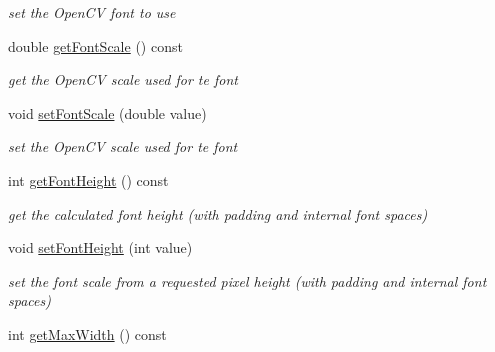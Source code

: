 \begin{DoxyCompactItemize}
\begin{DoxyCompactList}\small\item\em set the Open\+CV font to use \end{DoxyCompactList}\item 
double \hyperlink{classcanvascv_1_1Text_a8af0c36c755f596b31cedf3043a51552}{get\+Font\+Scale} () const \hypertarget{classcanvascv_1_1Text_a8af0c36c755f596b31cedf3043a51552}{}\label{classcanvascv_1_1Text_a8af0c36c755f596b31cedf3043a51552}

\begin{DoxyCompactList}\small\item\em get the Open\+CV scale used for te font \end{DoxyCompactList}\item 
void \hyperlink{classcanvascv_1_1Text_a6541ae87e4577272feef0e30e1d5a24d}{set\+Font\+Scale} (double value)\hypertarget{classcanvascv_1_1Text_a6541ae87e4577272feef0e30e1d5a24d}{}\label{classcanvascv_1_1Text_a6541ae87e4577272feef0e30e1d5a24d}

\begin{DoxyCompactList}\small\item\em set the Open\+CV scale used for te font \end{DoxyCompactList}\item 
int \hyperlink{classcanvascv_1_1Text_ae314e7c415cc0b5aa7e56af8734fe526}{get\+Font\+Height} () const \hypertarget{classcanvascv_1_1Text_ae314e7c415cc0b5aa7e56af8734fe526}{}\label{classcanvascv_1_1Text_ae314e7c415cc0b5aa7e56af8734fe526}

\begin{DoxyCompactList}\small\item\em get the calculated font height (with padding and internal font spaces) \end{DoxyCompactList}\item 
void \hyperlink{classcanvascv_1_1Text_abb99c1a3328766b2079619db76de9f04}{set\+Font\+Height} (int value)\hypertarget{classcanvascv_1_1Text_abb99c1a3328766b2079619db76de9f04}{}\label{classcanvascv_1_1Text_abb99c1a3328766b2079619db76de9f04}

\begin{DoxyCompactList}\small\item\em set the font scale from a requested pixel height (with padding and internal font spaces) \end{DoxyCompactList}\item 
int \hyperlink{classcanvascv_1_1Text_a1c968ed06ba141eeeb99e3cc369988a3}{get\+Max\+Width} () const \hypertarget{classcanvascv_1_1Text_a1c968ed06ba141eeeb99e3cc369988a3}{}\label{classcanvascv_1_1Text_a1c968ed06ba141eeeb99e3cc369988a3}


\end{DoxyCompactItemize}
